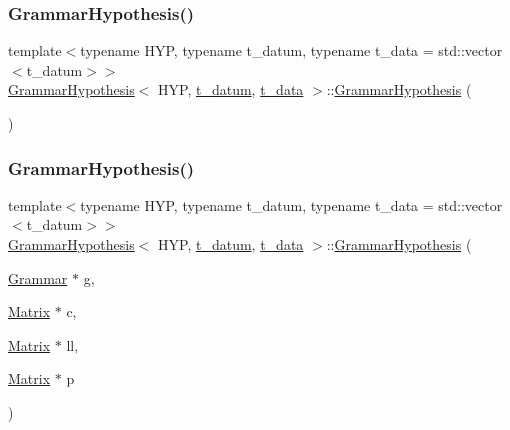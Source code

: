 \subsubsection{\texorpdfstring{Grammar\+Hypothesis()}{GrammarHypothesis()}\hspace{0.1cm}{\footnotesize\ttfamily [1/2]}}
{\footnotesize\ttfamily template$<$typename H\+YP, typename t\+\_\+datum, typename t\+\_\+data = std\+::vector$<$t\+\_\+datum$>$$>$ \\
\hyperlink{class_grammar_hypothesis}{Grammar\+Hypothesis}$<$ H\+YP, \hyperlink{class_bayesable_a7c93a2eeab708378eb321745908718d4}{t\+\_\+datum}, \hyperlink{class_bayesable_a70a593a67c7d43239ecc06bb4fd06a6b}{t\+\_\+data} $>$\+::\hyperlink{class_grammar_hypothesis}{Grammar\+Hypothesis} (\begin{DoxyParamCaption}{ }\end{DoxyParamCaption})\hspace{0.3cm}{\ttfamily [inline]}}

\mbox{\label{class_grammar_hypothesis_afe25b747b37d7ae984f9d3e4187484d8}} 
\subsubsection{\texorpdfstring{Grammar\+Hypothesis()}{GrammarHypothesis()}\hspace{0.1cm}{\footnotesize\ttfamily [2/2]}}
{\footnotesize\ttfamily template$<$typename H\+YP, typename t\+\_\+datum, typename t\+\_\+data = std\+::vector$<$t\+\_\+datum$>$$>$ \\
\hyperlink{class_grammar_hypothesis}{Grammar\+Hypothesis}$<$ H\+YP, \hyperlink{class_bayesable_a7c93a2eeab708378eb321745908718d4}{t\+\_\+datum}, \hyperlink{class_bayesable_a70a593a67c7d43239ecc06bb4fd06a6b}{t\+\_\+data} $>$\+::\hyperlink{class_grammar_hypothesis}{Grammar\+Hypothesis} (\begin{DoxyParamCaption}\item[{\hyperlink{class_grammar}{Grammar} $\ast$}]{g,  }\item[{\hyperlink{_eigen_numerics_8h_a645222978e81acfb2523a9bce34aecc0}{Matrix} $\ast$}]{c,  }\item[{\hyperlink{_eigen_numerics_8h_a645222978e81acfb2523a9bce34aecc0}{Matrix} $\ast$}]{ll,  }\item[{\hyperlink{_eigen_numerics_8h_a645222978e81acfb2523a9bce34aecc0}{Matrix} $\ast$}]{p }\end{DoxyParamCaption})\hspace{0.3cm}{\ttfamily [inline]}}



